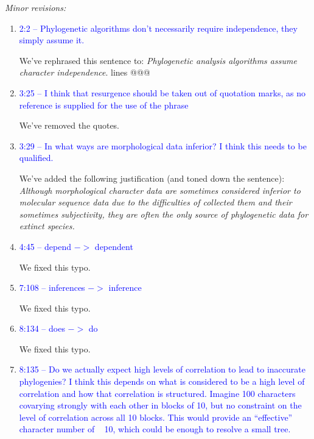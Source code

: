 \documentclass[12pt,letterpaper]{article}
\renewcommand{\subsection}[1]{%
\bigskip
\begin{center}
\begin{large}
\normalfont\itshape #1
\end{large}
\end{center}}
\begin{document}
\subsection{Minor revisions:}

\begin{enumerate}

\item{\textcolor{blue}{2:2 – Phylogenetic algorithms don't necessarily require independence, they simply assume it.}}
\label{abstract}

We've rephrased this sentence to:
\textit{Phylogenetic analysis algorithms assume character independence}. lines @@@

\item{\textcolor{blue}{3:25 – I think that resurgence should be taken out of quotation marks, as no reference is supplied for the use of the phrase}}

We've removed the quotes.

\item{\textcolor{blue}{3:29 – In what ways are morphological data inferior? I think this needs to be qualified.}}

We've added the following justification (and toned down the sentence):
\textit{Although morphological character data are sometimes considered inferior to molecular sequence data due to the difficulties of collected them and their sometimes subjectivity, they are often the only source of phylogenetic data for extinct species.}

\item{\textcolor{blue}{4:45 – depend $->$ dependent}}

We fixed this typo.

\item{\textcolor{blue}{7:108 – inferences $->$ inference}}

We fixed this typo.

\item{\textcolor{blue}{8:134 – does $->$ do}}

We fixed this typo.

\item{\textcolor{blue}{8:135 – Do we actually expect high levels of correlation to lead to inaccurate phylogenies? I think this depends on what is considered to be a high level of correlation and how that correlation is structured. Imagine 100 characters covarying strongly with each other in blocks of 10, but no constraint on the level of correlation across all 10 blocks. This would provide an ``effective'' character number of ~ 10, which could be enough to resolve a small tree.}}


\end{enumerate}
\end{document}
